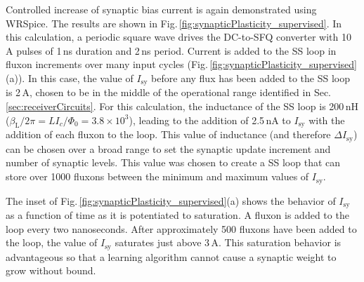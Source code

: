 \documentclass[twocolumn]{article}
\begin{document}
Controlled increase of synaptic bias current is again demonstrated using WRSpice. The results are shown in Fig.\,\ref{fig:synapticPlasticity_supervised}. In this calculation, a periodic square wave drives the DC-to-SFQ converter with 10\,\textmu A pulses of 1\,ns duration and 2\,ns period. Current is added to the SS loop in fluxon increments over many input cycles (Fig.\,\ref{fig:synapticPlasticity_supervised}(a)). In this case, the value of $I_{\mathrm{sy}}$ before any flux has been added to the SS loop is 2\,\textmu A, chosen to be in the middle of the operational range identified in Sec.\,\ref{sec:receiverCircuits}. For this calculation, the inductance of the SS loop is 200\,nH ($\beta_{\mathrm{L}}/2\pi = L I_c/\Phi_0 = 3.8\times 10^3$), leading to the addition of 2.5\,nA to $I_{\mathrm{sy}}$ with the addition of each fluxon to the loop. This value of inductance (and therefore $\Delta I_{\mathrm{sy}}$) can be chosen over a broad range to set the synaptic update increment and number of synaptic levels. This value was chosen to create a SS loop that can store over 1000 fluxons between the minimum and maximum values of $I_{\mathrm{sy}}$.

The inset of Fig.\,\ref{fig:synapticPlasticity_supervised}(a) shows the behavior of $I_{\mathrm{sy}}$ as a function of time as it is potentiated to saturation. A fluxon is added to the loop every two nanoseconds. After approximately 500 fluxons have been added to the loop, the value of $I_{\mathrm{sy}}$ saturates just above 3\,\textmu A. This saturation behavior is advantageous so that a learning algorithm cannot cause a synaptic weight to grow without bound. 
\end{document}
